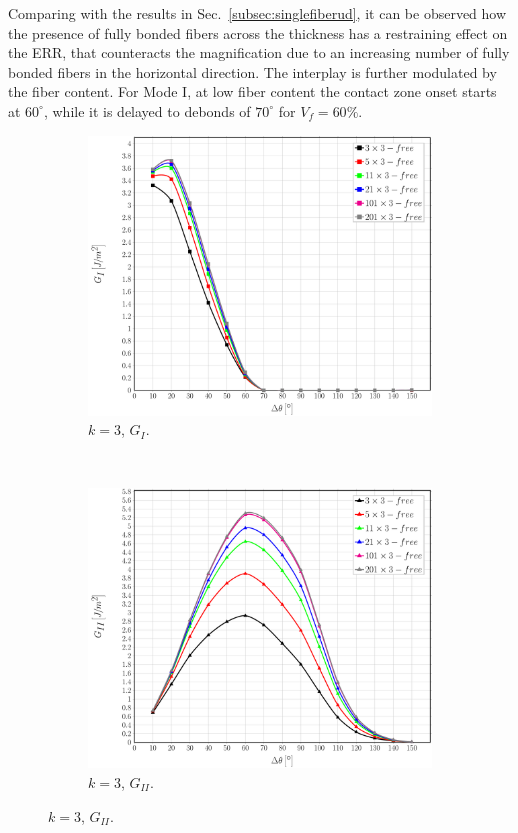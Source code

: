 \documentclass[review]{elsarticle}
\begin{document}
Comparing with the results in Sec.~\ref{subsec:singlefiberud}, it can be observed how the presence of fully bonded fibers across the thickness has a restraining effect on the ERR, that counteracts the magnification due to an increasing number of fully bonded fibers in the horizontal direction. The interplay is further modulated by the fiber content. For Mode I, at low fiber content the contact zone onset starts at $60^{\circ}$, while it is delayed to debonds of $70^{\circ}$ for $V_{f}=60\%$. 

\begin{figure}[!h]
\centering
    \begin{subfigure}[b]{0.475\textwidth}
        \includegraphics[width=\textwidth]{sideabovefibers-t3-vf60-GI.pdf}
        \caption{$k=3$, $G_{I}$.}\label{subfig:sideabovefiber60MIt3}
    \end{subfigure} ~
    \begin{subfigure}[b]{0.475\textwidth}
        \includegraphics[width=\textwidth]{sideabovefibers-t3-vf60-GII.pdf}
        \caption{$k=3$, $G_{II}$.}\label{subfig:sideabovefiber60MIIt3}
    \end{subfigure}
    

\end{figure}
\end{document}
